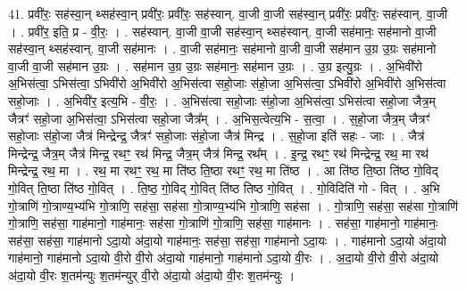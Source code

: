 \documentclass[17pt]{extarticle}
\begin{document}
41. प्रवी॑रः॒ सह॑स्वा॒न् थ्सह॑स्वा॒न् प्रवी॑रः॒ प्रवी॑रः॒ सह॑स्वान्. वा॒जी वा॒जी सह॑स्वा॒न् प्रवी॑रः॒ प्रवी॑रः॒ सह॑स्वान्. वा॒जी । . प्रवी॑र॒ इति॒ प्र - वी॒रः॒ । . सह॑स्वान्. वा॒जी वा॒जी सह॑स्वा॒न् थ्सह॑स्वान्. वा॒जी सह॑मानः॒ सह॑मानो वा॒जी सह॑स्वा॒न् थ्सह॑स्वान्. वा॒जी सह॑मानः । . वा॒जी सह॑मानः॒ सह॑मानो वा॒जी वा॒जी सह॑मान उ॒ग्र उ॒ग्रः सह॑मानो वा॒जी वा॒जी सह॑मान उ॒ग्रः । . सह॑मान उ॒ग्र उ॒ग्रः सह॑मानः॒ सह॑मान उ॒ग्रः । . उ॒ग्र इत्यु॒ग्रः । . अ॒भिवी॑रो अ॒भिस॑त्वा॒ ऽभिस॑त्वा॒ ऽभिवी॑रो अ॒भिवी॑रो अ॒भिस॑त्वा सहो॒जाः स॑हो॒जा अ॒भिस॑त्वा॒ ऽभिवी॑रो अ॒भिवी॑रो अ॒भिस॑त्वा सहो॒जाः । . अ॒भिवी॑र॒ इत्य॒भि - वी॒रः॒ । . अ॒भिस॑त्वा सहो॒जाः स॑हो॒जा अ॒भिस॑त्वा॒ ऽभिस॑त्वा सहो॒जा जैत्र॒म् जैत्रꣳ॑ सहो॒जा अ॒भिस॑त्वा॒ ऽभिस॑त्वा सहो॒जा जैत्र᳚म् । . अ॒भिस॒त्वेत्य॒भि - स॒त्वा॒ । . स॒हो॒जा जैत्र॒म् जैत्रꣳ॑ सहो॒जाः स॑हो॒जा जैत्र॑ मिन्द्रेन्द्र॒ जैत्रꣳ॑ सहो॒जाः स॑हो॒जा जैत्र॑ मिन्द्र । . स॒हो॒जा इति॑ सहः - जाः । . जैत्र॑ मिन्द्रेन्द्र॒ जैत्र॒म् जैत्र॑ मिन्द्र॒ रथꣳ॒॒ रथ॑ मिन्द्र॒ जैत्र॒म् जैत्र॑ मिन्द्र॒ रथ᳚म् । . इ॒न्द्र॒ रथꣳ॒॒ रथ॑ मिन्द्रेन्द्र॒ रथ॒ मा रथ॑ मिन्द्रेन्द्र॒ रथ॒ मा । . रथ॒ मा रथꣳ॒॒ रथ॒ मा ति॑ष्ठ ति॒ष्ठा रथꣳ॒॒ रथ॒ मा ति॑ष्ठ । . आ ति॑ष्ठ ति॒ष्ठा ति॑ष्ठ गो॒विद् गो॒वित् ति॒ष्ठा ति॑ष्ठ गो॒वित् । . ति॒ष्ठ॒ गो॒विद् गो॒वित् ति॑ष्ठ तिष्ठ गो॒वित् । . गो॒विदिति॑ गो - वित् । . अ॒भि गो॒त्राणि॑ गो॒त्राण्य॒भ्य॑भि गो॒त्राणि॒ सह॑सा॒ सह॑सा गो॒त्राण्य॒भ्य॑भि गो॒त्राणि॒ सह॑सा । . गो॒त्राणि॒ सह॑सा॒ सह॑सा गो॒त्राणि॑ गो॒त्राणि॒ सह॑सा॒ गाह॑मानो॒ गाह॑मानः॒ सह॑सा गो॒त्राणि॑ गो॒त्राणि॒ सह॑सा॒ गाह॑मानः । . सह॑सा॒ गाह॑मानो॒ गाह॑मानः॒ सह॑सा॒ सह॑सा॒ गाह॑मानो ऽदा॒यो अ॑दा॒यो गाह॑मानः॒ सह॑सा॒ सह॑सा॒ गाह॑मानो ऽदा॒यः । . गाह॑मानो ऽदा॒यो अ॑दा॒यो गाह॑मानो॒ गाह॑मानो ऽदा॒यो वी॒रो वी॒रो अ॑दा॒यो गाह॑मानो॒ गाह॑मानो ऽदा॒यो वी॒रः । . अ॒दा॒यो वी॒रो वी॒रो अ॑दा॒यो अ॑दा॒यो वी॒रः श॒तम॑न्युः श॒तम॑न्युर् वी॒रो अ॑दा॒यो अ॑दा॒यो वी॒रः श॒तम॑न्युः । \newline
\pagebreak
{}
\end{document}
